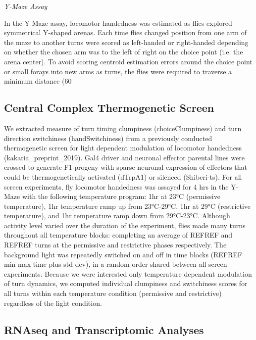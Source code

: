 \documentclass[12pt,letterpaper]{article}
\begin{document}
\textit{Y-Maze Assay}

In the Y-Maze assay, locomotor handedness was estimated as flies explored symmetrical Y-shaped arenas. Each time flies changed position from one arm of the maze to another turns were scored as left-handed or right-handed depending on whether the chosen arm was to the left of right on the choice point (i.e. the arena center). To avoid scoring centroid estimation errors around the choice point or small forays into new arms as turns, the flies were required to traverse a minimum distance (60%

\subsection{Central Complex Thermogenetic Screen}

We extracted measure of turn timing clumpiness (choiceClumpiness) and turn direction switchiness (handSwitchiness) from a previously conducted thermogenetic screen for light dependent modulation of locomotor handedness (kakaria_preprint_2019). Gal4 driver and neuronal effector parental lines were crossed to generate F1 progeny with sparse neuronal expression of effectors that could be thermogenetically activated (dTrpA1) or silenced (Shiberi-ts). For all screen experiments, fly locomotor handedness was assayed for 4 hrs in the Y-Maze with the following temperature program: 1hr at 23°C (permissive temperature), 1hr temperature ramp up from 23°C-29°C, 1hr at 29°C (restrictive temperature), and 1hr temperature ramp down from 29°C-23°C. Although activity level varied over the duration of the experiment, flies made many turns throughout all temperature blocks: completing an average of REFREF and REFREF turns at the permissive and restrictive phases respectively. The background light was repeatedly switched on and off in time blocks (REFREF min max time plus std dev), in a random order shared between all screen experiments. Because we were interested only temperature dependent modulation of turn dynamics, we computed individual clumpiness and switchiness scores for all turns within each temperature condition (permissive and restrictive) regardless of the light condition.

\subsection{RNAseq and Transcriptomic Analyses}
\end{document}
